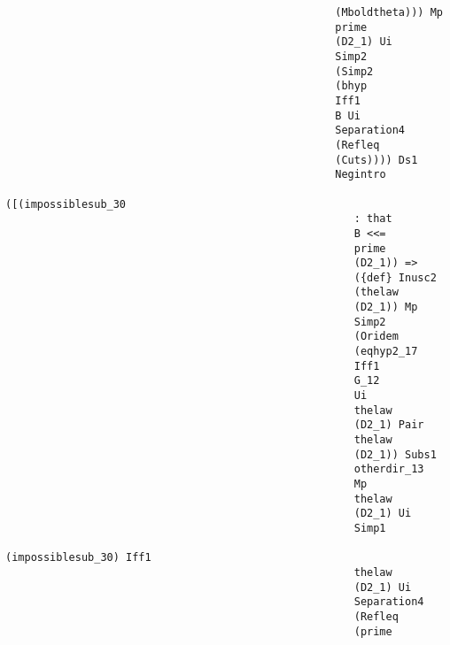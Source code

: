 \documentclass[12pt]{article}
\begin{document}
\begin{verbatim}
                                                    (Mboldtheta))) Mp 
                                                    prime 
                                                    (D2_1) Ui 
                                                    Simp2 
                                                    (Simp2 
                                                    (bhyp 
                                                    Iff1 
                                                    B Ui 
                                                    Separation4 
                                                    (Refleq 
                                                    (Cuts)))) Ds1 
                                                    Negintro 
                                                    ([(impossiblesub_30 
                                                       : that 
                                                       B <<= 
                                                       prime 
                                                       (D2_1)) => 
                                                       ({def} Inusc2 
                                                       (thelaw 
                                                       (D2_1)) Mp 
                                                       Simp2 
                                                       (Oridem 
                                                       (eqhyp2_17 
                                                       Iff1 
                                                       G_12 
                                                       Ui 
                                                       thelaw 
                                                       (D2_1) Pair 
                                                       thelaw 
                                                       (D2_1)) Subs1 
                                                       otherdir_13 
                                                       Mp 
                                                       thelaw 
                                                       (D2_1) Ui 
                                                       Simp1 
                                                       (impossiblesub_30) Iff1 
                                                       thelaw 
                                                       (D2_1) Ui 
                                                       Separation4 
                                                       (Refleq 
                                                       (prime 

\end{verbatim}
\end{document}
